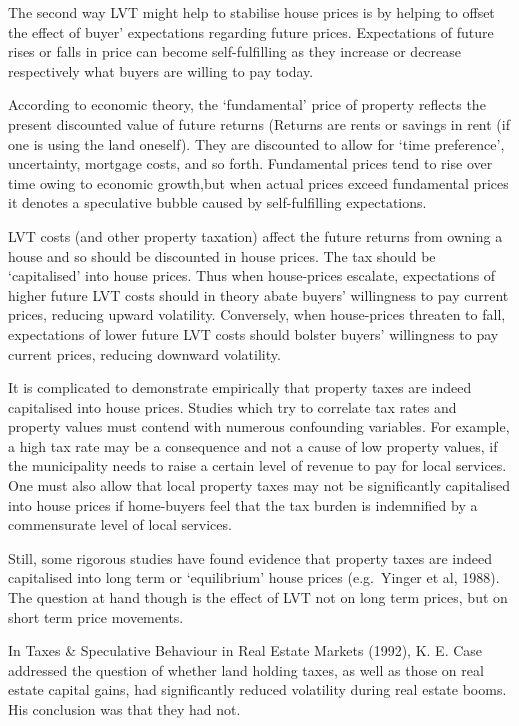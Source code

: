 \documentclass[]{tufte-handout}
\begin{document}
The second way LVT might help to stabilise house prices is by helping to
offset the effect of buyer' expectations regarding future prices.
Expectations of future rises or falls in price can become
self-fulfilling as they increase or decrease respectively what buyers
are willing to pay today.

According to economic theory, the `fundamental' price of property
reflects the present discounted value of future returns (Returns are
rents or savings in rent (if one is using the land oneself). They are
discounted to allow for `time preference', uncertainty, mortgage costs,
and so forth. Fundamental prices tend to rise over time owing to
economic growth,but when actual prices exceed fundamental prices it
denotes a speculative bubble caused by self-fulfilling expectations.

LVT costs (and other property taxation) affect the future returns from
owning a house and so should be discounted in house prices. The tax
should be `capitalised' into house prices. Thus when house-prices
escalate, expectations of higher future LVT costs should in theory abate
buyers' willingness to pay current prices, reducing upward volatility.
Conversely, when house-prices threaten to fall, expectations of lower
future LVT costs should bolster buyers' willingness to pay current
prices, reducing downward volatility.

It is complicated to demonstrate empirically that property taxes are
indeed capitalised into house prices. Studies which try to correlate tax
rates and property values must contend with numerous confounding
variables. For example, a high tax rate may be a consequence and not a
cause of low property values, if the municipality needs to raise a
certain level of revenue to pay for local services. One must also allow
that local property taxes may not be significantly capitalised into
house prices if home-buyers feel that the tax burden is indemnified by a
commensurate level of local services.

Still, some rigorous studies have found evidence that property taxes are
indeed capitalised into long term or `equilibrium' house prices
(e.g.~Yinger et al, 1988). The question at hand though is the effect of
LVT not on long term prices, but on short term price movements.

In Taxes \& Speculative Behaviour in Real Estate Markets (1992), K. E.
Case addressed the question of whether land holding taxes, as well as
those on real estate capital gains, had significantly reduced volatility
during real estate booms. His conclusion was that they had not.
\end{document}

